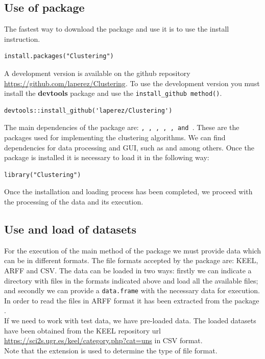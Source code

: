 \subsection{Use of  package}

The fastest way to download the  package and use it is to use the install instruction.

\begin{verbatim}
install.packages("Clustering")
\end{verbatim}
A development version is available on the github repository \url{https://github.com/laperez/Clustering}. To use the development version you must install the \textbf{devtools} package and use the \texttt{install\_github method()}.

\begin{verbatim}
devtools::install_github('laperez/Clustering')
\end{verbatim}
The main dependencies of the   package are: \texttt{, , , , ,  and }. These are the packages used for implementing the clustering algorithms. We can find dependencies for data processing and GUI, such as \texttt{} and \texttt{} among others. Once the package is installed it is necessary to load it in the following way:

\begin{verbatim}
library("Clustering")
\end{verbatim}
Once the installation and loading process has been completed, we proceed with the processing of the data and its execution.

\subsection {Use and load of datasets}

For the execution of the main method of the package we must provide data which can be in different formats. The file formats accepted by the package are: KEEL, ARFF and CSV. The data can be loaded in two ways: firstly we can indicate a directory with files in the formats indicated above and load all the available files; and secondly we can provide a \texttt{data.frame} with the necessary data for execution. In order to read the files in ARFF format it has been extracted from the  package \citep{b55}.\\
If we need to work with test data, we have pre-loaded data. The loaded datasets have been obtained from the KEEL repository url \url{https://sci2s.ugr.es/keel/category.php?cat=uns} in CSV format.\\
Note that the extension is used to determine the type of file format.

